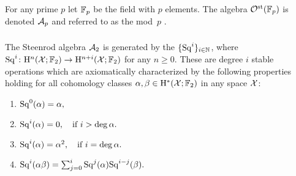 For any prime $p$ let \({\mathbb{F}_p}\) be the field with \(p\) elements.
The algebra $\mathcal{O}^{\mathrm{st}}({\mathbb{F}_p})$ is denoted $\mathcal{A}_p$ and referred to as the mod~$p$ .

%

\subsubsection{}

The Steenrod algebra $\mathcal{A}_2$ is generated by the  $\{\mathrm{Sq}^i\}_{i \in \mathbb{N}}$, where $\mathrm{Sq}^i \colon \mathrm{H}^n(\mathcal{X}; {\mathbb{F}_2}) \to \mathrm{H}^{n+i}(\mathcal{X}; {\mathbb{F}_2})$ for any $n\geq 0$.
These are degree $i$ stable operations which are axiomatically characterized by the following properties holding for all cohomology classes $\alpha,\beta \in \mathrm{H}^*(\mathcal{X}; {\mathbb{F}_2})$ in any space $\mathcal{X}$:
\begin{enumerate}
	\item \(\mathrm{Sq}^0(\alpha) = \alpha,\)
	\item \(\mathrm{Sq}^i(\alpha) = 0, \quad \text{if } i > \deg\alpha.\)
	\item \(\mathrm{Sq}^i(\alpha) = \alpha^2, \quad \text{if } i = \deg\alpha.\)
	\item \(\mathrm{Sq}^i(\alpha \beta) = \textstyle\sum_{j=0}^{i} \mathrm{Sq}^j(\alpha) \mathrm{Sq}^{i-j}(\beta).\)
\end{enumerate}

